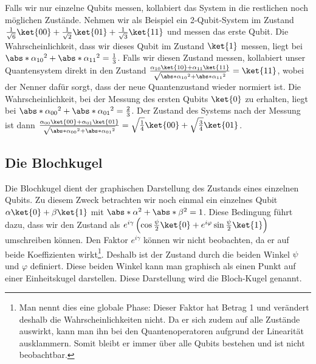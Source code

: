 Falls wir nur einzelne Qubits messen, kollabiert das System in die restlichen noch möglichen Zustände. Nehmen wir als Beispiel ein 2-Qubit-System im Zustand $\frac{1}{\sqrt{6}}\ket{00} + \frac{1}{\sqrt{2}}\ket{01} + \frac{1}{\sqrt{3}}\ket{11}$ und messen das erste Qubit. Die Wahrscheinlichkeit, dass wir dieses Qubit im Zustand $\ket{1}$ messen, liegt bei $\abs*{\alpha_{10}}^2 + \abs*{\alpha_{11}}^2 = \frac{1}{3}$. Falls wir diesen Zustand messen, kollabiert unser Quantensystem direkt in den Zustand $\frac{\alpha_{10}\ket{10} + \alpha_{11}\ket{11}}{\sqrt{\abs*{\alpha_{10}}^2 + \abs*{\alpha_{11}}^2}} = \ket{11}$, wobei der Nenner dafür sorgt, dass der neue Quantenzustand wieder normiert ist. Die Wahrscheinlichkeit, bei der Messung des ersten Qubits $\ket{0}$ zu erhalten, liegt bei $\abs*{\alpha_{00}}^2 + \abs*{\alpha_{01}}^2 = \frac{2}{3}$. Der Zustand des Systems nach der Messung ist dann $\frac{\alpha_{00}\ket{00} + \alpha_{01}\ket{01}}{\sqrt{\abs*{\alpha_{00}}^2 + \abs*{\alpha_{01}}^2}} = \sqrt{\frac{1}{4}}\ket{00} + \sqrt{\frac{3}{4}}\ket{01}$.

\subsection{Die Blochkugel}
Die Blochkugel dient der graphischen Darstellung des Zustands eines einzelnen Qubits. Zu diesem Zweck betrachten wir noch einmal ein einzelnes Qubit $\alpha\ket{0} + \beta\ket{1}$ mit $\abs*{\alpha}^2 + \abs*{\beta}^2 = 1$. Diese Bedingung führt dazu, dass wir den Zustand als $e^{i\gamma}\left(\cos\frac{\psi}{2}\ket{0} + e^{i\varphi}\sin\frac{\psi}{2}\ket{1}\right)$ umschreiben können. Den Faktor $e^{i\gamma}$ können wir nicht beobachten, da er auf beide Koeffizienten wirkt\footnote{Man nennt dies eine globale Phase: Dieser Faktor hat Betrag 1 und verändert deshalb die Wahrscheinlichkeiten nicht. Da er sich zudem auf alle Zustände auswirkt, kann man ihn bei den Quantenoperatoren aufgrund der Linearität ausklammern. Somit bleibt er immer über alle Qubits bestehen und ist nicht beobachtbar.}. Deshalb ist der Zustand durch die beiden Winkel $\psi$ und $\varphi$ definiert. Diese beiden Winkel kann man graphisch als einen Punkt auf einer Einheitskugel darstellen. Diese Darstellung wird die Bloch-Kugel genannt.
